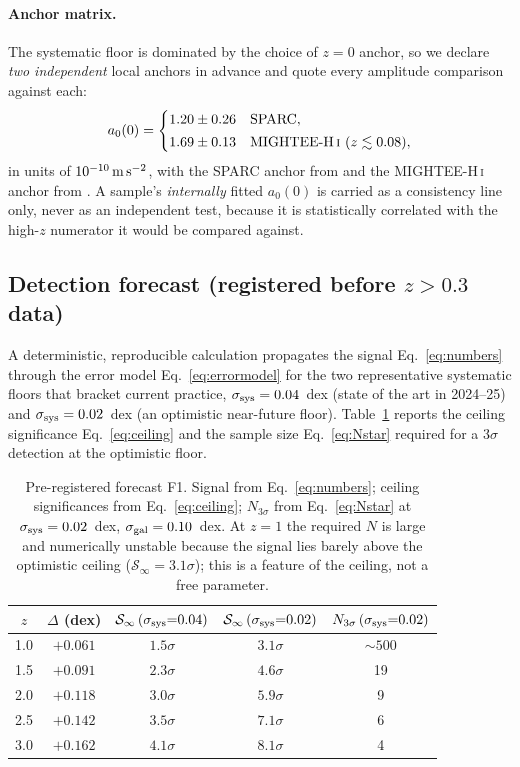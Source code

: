 \documentclass[fleqn,usenatbib]{mnras}
\newcommand{\azero}{a_0}
\newcommand{\sgal}{\sigma_{\rm gal}}
\newcommand{\ssys}{\sigma_{\rm sys}}
\begin{document}
\paragraph{Anchor matrix.} The systematic floor is dominated by the choice of $z=0$
anchor, so we declare \emph{two independent} local anchors in advance and quote every
amplitude comparison against each:
\begin{equation}
\azero(0)=\begin{cases}
1.20\pm0.26 & \text{SPARC},\\[2pt]
1.69\pm0.13 & \text{MIGHTEE-H\,\textsc{i} }(z\lesssim0.08),
\end{cases}
\label{eq:anchors}
\end{equation}
in units of $10^{-10}\,{\rm m\,s^{-2}}$, with the SPARC anchor from
\citet{McGaugh2016,Lelli2016} and the MIGHTEE-H\,\textsc{i} anchor from
\citet{Varasteanu2025}. A sample's \emph{internally} fitted
$\azero(0)$ is carried as a consistency line only, never as an independent test,
because it is statistically correlated with the high-$z$ numerator it would be
compared against.

\subsection{Detection forecast (registered before $z>0.3$ data)}\label{sec:forecast}

A deterministic, reproducible calculation propagates the signal
Eq.~\eqref{eq:numbers} through the error model Eq.~\eqref{eq:errormodel} for the two
representative systematic floors that bracket current practice,
$\ssys=0.04$~dex (state of the art in 2024--25) and $\ssys=0.02$~dex (an optimistic
near-future floor). Table~\ref{tab:forecast} reports the ceiling significance
Eq.~\eqref{eq:ceiling} and the sample size Eq.~\eqref{eq:Nstar} required for a
$3\sigma$ detection at the optimistic floor.

\begin{table}
\centering
\caption{Pre-registered forecast F1. Signal from Eq.~\eqref{eq:numbers}; ceiling
significances from Eq.~\eqref{eq:ceiling}; $N_{3\sigma}$ from Eq.~\eqref{eq:Nstar} at
$\ssys=0.02$~dex, $\sgal=0.10$~dex. At $z=1$ the required $N$ is large and
numerically unstable because the signal lies barely above the optimistic ceiling
($\mathcal{S}_\infty=3.1\sigma$); this is a feature of the ceiling, not a free
parameter.}
\label{tab:forecast}
\setlength{\tabcolsep}{3pt}
\begin{tabular}{@{}ccccc@{}}
\toprule
$z$ & $\Delta$ (dex) & $\mathcal{S}_\infty\,(\ssys{=}0.04)$
& $\mathcal{S}_\infty\,(\ssys{=}0.02)$ & $N_{3\sigma}\,(\ssys{=}0.02)$ \\
\midrule
1.0 & $+0.061$ & $1.5\sigma$ & $3.1\sigma$ & $\sim500$ \\
1.5 & $+0.091$ & $2.3\sigma$ & $4.6\sigma$ & 19 \\
2.0 & $+0.118$ & $3.0\sigma$ & $5.9\sigma$ & 9 \\
2.5 & $+0.142$ & $3.5\sigma$ & $7.1\sigma$ & 6 \\
3.0 & $+0.162$ & $4.1\sigma$ & $8.1\sigma$ & 4 \\
\bottomrule
\end{tabular}
\end{table}
\end{document}
